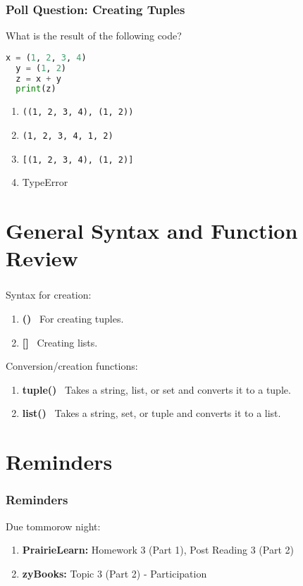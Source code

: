 \documentclass{beamer}
\begin{document}
%
%
\begin{frame}[fragile]
  \frametitle{Poll Question: Creating Tuples} 
  What is the result of the following code?
  \begin{lstlisting}[language=Python, autogobble]
  x = (1, 2, 3, 4)
  y = (1, 2)
  z = x + y
  print(z)
  \end{lstlisting}
  \vfill
  \begin{enumerate}[A] 
    \item \lstinline|((1, 2, 3, 4), (1, 2))|
    \item \lstinline|(1, 2, 3, 4, 1, 2)|
    \item \lstinline|[(1, 2, 3, 4), (1, 2)]|
    \item TypeError
  \end{enumerate}
\end{frame}

\section{General Syntax and Function Review}

%
%
\begin{frame}[fragile]
  \frametitle{}
  Syntax for creation:
  \begin{enumerate}
    \item \textbf{()} \textrightarrow \ For creating tuples.
    \item \textbf{[]} \textrightarrow \ Creating lists.
  \end{enumerate}
  \vfill
  Conversion/creation functions:
  \begin{enumerate}
    \item \textbf{tuple()} \textrightarrow \ Takes a string, list, or set and converts it to a tuple.
    \item \textbf{list()} \ Takes a string, set, or tuple and converts it to a list.
  \end{enumerate}
\end{frame}

\section{Reminders}

\begin{frame}
  \frametitle{Reminders}
  Due tommorow night:
  \begin{enumerate}
    \item \textbf{PrairieLearn: } Homework 3 (Part 1), Post Reading 3 (Part 2)
    \item \textbf{zyBooks: } Topic 3 (Part 2) - Participation
  \end{enumerate}
\end{frame}
\end{document}
